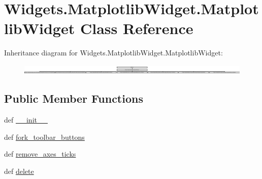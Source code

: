 \hypertarget{classWidgets_1_1MatplotlibWidget_1_1MatplotlibWidget}{\section{Widgets.\-Matplotlib\-Widget.\-Matplotlib\-Widget Class Reference}
\label{classWidgets_1_1MatplotlibWidget_1_1MatplotlibWidget}
}
Inheritance diagram for Widgets.\-Matplotlib\-Widget.\-Matplotlib\-Widget\-:\begin{figure}[H]
\begin{center}
\leavevmode
\includegraphics[height=0.463320cm]{classWidgets_1_1MatplotlibWidget_1_1MatplotlibWidget}
\end{center}
\end{figure}
\subsection*{Public Member Functions}
\begin{DoxyCompactItemize}
\item 
def \hyperlink{classWidgets_1_1MatplotlibWidget_1_1MatplotlibWidget_a61cf93497bbdd82f5f6b62a074ab47b2}{\-\_\-\-\_\-init\-\_\-\-\_\-}
\item 
def \hyperlink{classWidgets_1_1MatplotlibWidget_1_1MatplotlibWidget_a4e4b2d118d14e76c0ff72b45f8cce460}{fork\-\_\-toolbar\-\_\-buttons}
\item 
def \hyperlink{classWidgets_1_1MatplotlibWidget_1_1MatplotlibWidget_a4ed271205f620e901ac55429b599bad4}{remove\-\_\-axes\-\_\-ticks}
\item 
def \hyperlink{classWidgets_1_1MatplotlibWidget_1_1MatplotlibWidget_aae8259a60c7e1e2989985e39dadf23da}{delete}
\end{DoxyCompactItemize}
